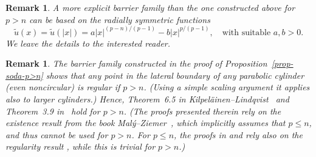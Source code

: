 \documentclass[a4paper, twoside]{article}
\theoremstyle{propositional}
\theoremstyle{descriptive}
\newtheorem{remark}[thm]{Remark}
\numberwithin{equation}{section}
\newcommand{\ut}{\tilde{u}}
\begin{document}
\begin{remark}
A more explicit barrier family than the one constructed
above for $p > n$ can be based on the radially symmetric functions
\[
\ut(x)= \ut(|x|)= a|x|^{(p-n)/(p-1)} - b|x|^{p/(p-1)},
\quad \text{with suitable } a,b>0.
\]
We leave the details to the interested reader.
\end{remark}

\begin{remark}
The barrier family constructed in the proof of Proposition~\ref{prop-soda-p>n}
shows that any point in the lateral boundary of any parabolic cylinder 
(even noncircular) is regular if $p>n$.
(Using a simple scaling argument it applies also to larger cylinders.)
Hence, Theorem~6.5 in Kilpel\"ainen--Lindqvist~\cite{KiLi96} 
and Theorem~3.9 in~\cite{BBGP} hold for $p>n$.
(The proofs presented therein 
rely on the  existence result from the book 
Mal\'y--Ziemer~\cite[Theorem~6.21]{MaZi}, 
which implicitly assumes that $p\le n$,
and thus cannot be used for $p>n$.
For $p \le n$,  the proofs in \cite{KiLi96}  and \cite{BBGP} rely also
on the regularity
result \cite[Corollary~6.22]{MaZi},  while this is trivial for $p>n$.)
\end{remark}
\end{document}
